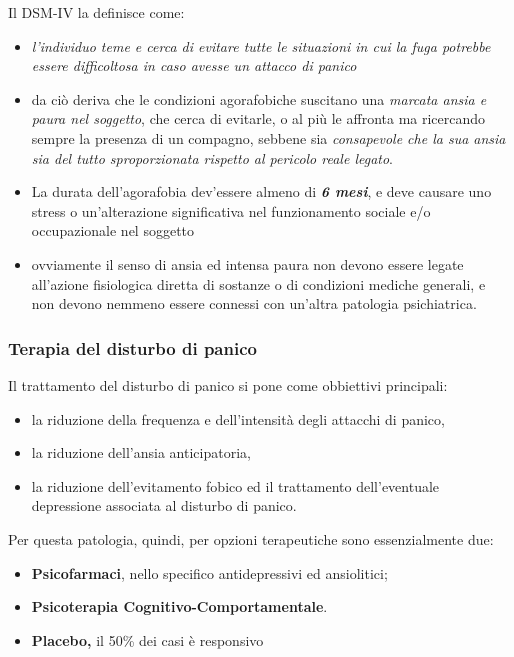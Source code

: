 Il DSM-IV la definisce come:

\begin{itemize}
\item
  \emph{l'individuo teme e cerca di evitare tutte le situazioni in cui
  la fuga potrebbe essere difficoltosa in caso avesse un attacco di
  panico}
\item
  da ciò deriva che le condizioni agorafobiche suscitano una
  \emph{marcata ansia e paura nel soggetto}, che cerca di evitarle, o al
  più le affronta ma ricercando sempre la presenza di un compagno,
  sebbene sia \emph{consapevole che la sua ansia sia del tutto
  sproporzionata rispetto al pericolo reale legato}.
\item
  La durata dell'agorafobia dev'essere almeno di \textbf{\emph{6 mesi}},
  e deve causare uno stress o un'alterazione significativa nel
  funzionamento sociale e/o occupazionale nel soggetto
\item
  ovviamente il senso di ansia ed intensa paura non devono essere legate
  all'azione fisiologica diretta di sostanze o di condizioni mediche
  generali, e non devono nemmeno essere connessi con un'altra patologia
  psichiatrica.
  \end{itemize}
 
\subsubsection{Terapia del disturbo di panico}

Il trattamento del disturbo di panico si pone come obbiettivi
principali:

\begin{itemize}
\item
  la riduzione della frequenza e dell'intensità degli attacchi di
  panico,
\item
  la riduzione dell'ansia anticipatoria,
\item
  la riduzione dell'evitamento fobico ed il trattamento dell'eventuale
  depressione associata al disturbo di panico.
\end{itemize}

Per questa patologia, quindi, per opzioni terapeutiche sono
essenzialmente due:

\begin{itemize}
\item
  \textbf{Psicofarmaci}, nello specifico antidepressivi ed ansiolitici;
\item
  \textbf{Psicoterapia Cognitivo-Comportamentale}.
\item
  \textbf{Placebo,} il 50\% dei casi è responsivo
\end{itemize}

